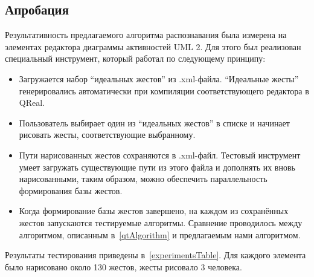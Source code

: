 \documentclass[a5paper]{article}
\begin{document}
\subsection{Апробация}

Результативность предлагаемого алгоритма распознавания была измерена на элементах редактора диаграммы активностей UML 2. Для этого был реализован специальный инструмент, который работал по следующему принципу:
\begin{itemize}
  \item Загружается набор ``идеальных жестов'' из .xml-файла. ``Идеальные жесты'' генерировались автоматически при компиляции соответствующего редактора в QReal.
  \item Пользователь выбирает один из ``идеальных жестов'' в списке и начинает рисовать жесты, соответствующие выбранному.
  \item Пути нарисованных жестов сохраняются в .xml-файл. Тестовый инструмент умеет загружать существующие пути из этого файла и дополнять их вновь нарисованными, таким образом, можно обеспечить параллельность формирования базы жестов.
  \item Когда формирование базы жестов завершено, на каждом из сохранённых жестов запускаются тестируемые алгоритмы. Сравнение проводилось между алгоритмом, описанным в~\ref{qtAlgorithm} и предлагаемым нами алгоритмом.
\end{itemize}

Результаты тестирования приведены в~\ref{experimentsTable}. Для каждого элемента было нарисовано около 130 жестов, жесты рисовало 3 человека.
\end{document}
